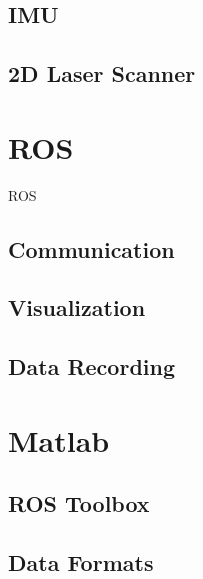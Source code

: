 	\subsection{IMU}\label{ssec:IMU}

	\subsection{2D Laser Scanner}\label{ssec:laserScanner}

\section{ROS}\label{sec:ros}
	\ac{ROS}
	\subsection{Communication}\label{ssec:communication}
	\subsection{Visualization}\label{ssec:visualization}
	\subsection{Data Recording}\label{ssec:dataRecording}

\section{Matlab}\label{sec:matlab}
	\subsection{ROS Toolbox}\label{ssec:rosToolbox}
	\subsection{Data Formats}\label{ssec:dataFormats}

